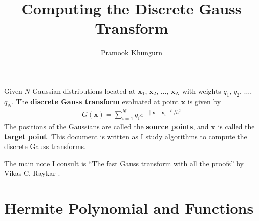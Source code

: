 \documentclass[10pt]{article}
\title{Computing the Discrete Gauss Transform}
\author{Pramook Khungurn}
\newcommand{\ve}[1]{\mathbf{#1}}
\begin{document}
\maketitle	

Given $N$ Gaussian distributions located at $\ve{x}_1$, $\ve{x}_2$, $\dotsc$, $\ve{x}_N$ with weights $q_1$, $q_2$, $\dotsc$, $q_N$. The {\bf discrete Gauss transform} evaluated at point $\ve{x}$ is given by
\begin{align*}
G(\ve{x}) = \sum_{i=1}^N q_i e^{-\| \ve{x} - \ve{x}_i \|^2 / h^2}
\end{align*}
The positions of the Gaussians are called the {\bf source points}, and $\ve{x}$ is called the {\bf target point}. This document is written as I study algorithms to compute the discrete Gauss transforms.

The main note I consult is ``The fast Gauss transform with all the proofs'' by Vikas C. Raykar \cite{vikas}.

\section{Hermite Polynomial and Functions}\label{sec:hermite_polynomials} %
\end{document}
